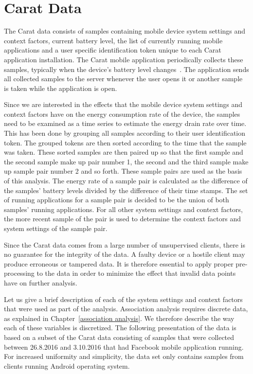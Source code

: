 \section{Carat Data} \label{carat data}

The Carat data consists of samples containing mobile device system settings and context factors, current battery level, the list of currently running mobile applications and a user specific identification token unique to each Carat application installation. The Carat mobile application periodically collects these samples, typically when the device's battery level changes~\cite{Oliner:2013:CCE:2517351.2517354}. The application sends all collected samples to the server whenever the user opens it or another sample is taken while the application is open.

Since we are interested in the effects that the mobile device system settings and context factors have on the energy consumption rate of the device, the samples need to be examined as a time series to estimate the energy drain rate over time. This has been done by grouping all samples according to their user identification token. The grouped tokens are then sorted according to the time that the sample was taken. These sorted samples are then paired up so that the first sample and the second sample make up pair number 1, the second and the third sample make up sample pair number 2 and so forth. These sample pairs are used as the basis of this analysis. The energy rate of a sample pair is calculated as the difference of the samples' battery levels divided by the difference of their time stamps. The set of running applications for a sample pair is decided to be the union of both samples' running applications. For all other system settings and context factors, the more recent sample of the pair is used to determine the context factors and system settings of the sample pair.

Since the Carat data comes from a large number of unsupervised clients, there is no guarantee for the integrity of the data. A faulty device or a hostile client may produce erroneous or tampered data. It is therefore essential to apply proper pre-processing to the data in order to minimize the effect that invalid data points have on further analysis. 

Let us give a brief description of each of the system settings and context factors that were used as part of the analysis. Association analysis requires discrete data, as explained in Chapter~\ref{association analysis}. We therefore describe the way each of these variables is discretized. The following presentation of the data is based on a subset of the Carat data consisting of samples that were collected between 26.8.2016 and 3.10.2016 that had Facebook mobile application running. For increased uniformity and simplicity, the data set only contains samples from clients running Android operating system. 

